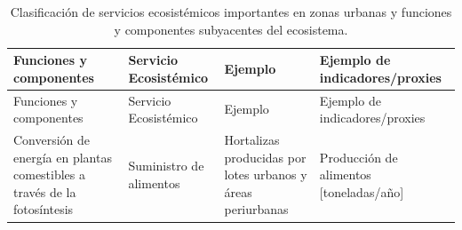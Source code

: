 \documentclass[12pt,a4paper,oneside, openany]{book}
\theoremstyle{definition}
\theoremstyle{definition}
\theoremstyle{definition}
\theoremstyle{remark}
\begin{document}
\begin{longtable}[]{@{}llll@{}}
\caption{\label{tab:clasf-SerAm} Clasificación de servicios ecosistémicos
importantes en zonas urbanas y funciones y componentes subyacentes del
ecosistema.}\tabularnewline
\toprule
\begin{minipage}[b]{0.26\columnwidth}\raggedright\strut
Funciones y componentes\strut
\end{minipage} & \begin{minipage}[b]{0.22\columnwidth}\raggedright\strut
Servicio Ecosistémico\strut
\end{minipage} & \begin{minipage}[b]{0.19\columnwidth}\raggedright\strut
Ejemplo\strut
\end{minipage} & \begin{minipage}[b]{0.22\columnwidth}\raggedright\strut
Ejemplo de indicadores/proxies\strut
\end{minipage}\tabularnewline
\midrule
\endfirsthead
\toprule
\begin{minipage}[b]{0.26\columnwidth}\raggedright\strut
Funciones y componentes\strut
\end{minipage} & \begin{minipage}[b]{0.22\columnwidth}\raggedright\strut
Servicio Ecosistémico\strut
\end{minipage} & \begin{minipage}[b]{0.19\columnwidth}\raggedright\strut
Ejemplo\strut
\end{minipage} & \begin{minipage}[b]{0.22\columnwidth}\raggedright\strut
Ejemplo de indicadores/proxies\strut
\end{minipage}\tabularnewline
\midrule
\endhead
\begin{minipage}[t]{0.26\columnwidth}\raggedright\strut
Conversión de energía en plantas comestibles a través de la
fotosíntesis\strut
\end{minipage} & \begin{minipage}[t]{0.22\columnwidth}\raggedright\strut
Suministro de alimentos\strut
\end{minipage} & \begin{minipage}[t]{0.19\columnwidth}\raggedright\strut
Hortalizas producidas por lotes urbanos y áreas periurbanas\strut
\end{minipage} & \begin{minipage}[t]{0.22\columnwidth}\raggedright\strut
Producción de alimentos {[}toneladas/año{]}\strut
\end{minipage}\tabularnewline

\end{longtable}
\end{document}
